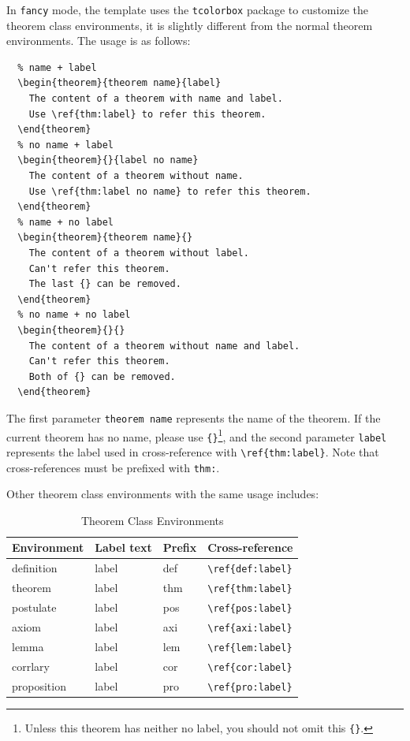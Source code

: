 \documentclass[11pt,bibtex]{elegantbook}
\begin{document}
In \lstinline{fancy} mode, the template uses the \lstinline{tcolorbox} package to customize the theorem class environments, it is slightly different from the normal theorem environments. The usage is as follows:
\begin{lstlisting}
  % name + label
  \begin{theorem}{theorem name}{label}
    The content of a theorem with name and label.
    Use \ref{thm:label} to refer this theorem.
  \end{theorem}
  % no name + label
  \begin{theorem}{}{label no name}
    The content of a theorem without name.
    Use \ref{thm:label no name} to refer this theorem.
  \end{theorem}
  % name + no label
  \begin{theorem}{theorem name}{}
    The content of a theorem without label.
    Can't refer this theorem.
    The last {} can be removed.
  \end{theorem}
  % no name + no label
  \begin{theorem}{}{}
    The content of a theorem without name and label.
    Can't refer this theorem.
    Both of {} can be removed.
  \end{theorem}
  \end{lstlisting}

The first parameter \lstinline{theorem name} represents the name of the theorem. If the current theorem has no name, please use \lstinline|{}|\cprotect\footnote{Unless this theorem has neither no label, you should not omit this \verb|{}|.}, and the second parameter \lstinline{label} represents the label used in cross-reference with \verb|\ref{thm:label}|. Note that cross-references must be prefixed with \lstinline{thm:}.

Other theorem class environments with the same usage includes:

\begin{table}[htbp]
\centering
\caption{Theorem Class Environments}
  \begin{tabular}{llll}
  \toprule
  Environment & Label text & Prefix & Cross-reference \\
  \midrule
  definition & label & def   & \lstinline|\ref{def:label}| \\
  theorem & label & thm   & \lstinline|\ref{thm:label}| \\
  postulate & label & pos & \lstinline|\ref{pos:label}| \\
  axiom & label & axi & \lstinline|\ref{axi:label}|\\
  lemma & label & lem   & \lstinline|\ref{lem:label}| \\
  corrlary & label & cor   & \lstinline|\ref{cor:label}| \\
  proposition & label & pro   & \lstinline|\ref{pro:label}| \\
  \bottomrule
  \end{tabular}%
\label{tab:theorem-class}%
\end{table}%
\end{document}
